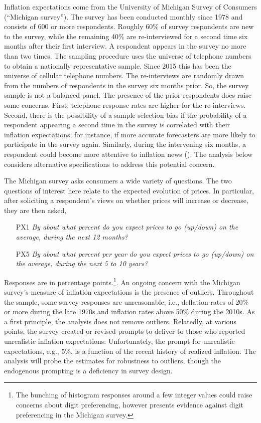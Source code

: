 \documentclass[12pt]{article}
\begin{document}
Inflation expectations come from the University of Michigan Survey of Consumers (``Michigan survey''). The survey has been conducted monthly since 1978 and consists of 600 or more respondents. Roughly 60\% of survey respondents are new to the survey, while the remaining 40\% are re-interviewed for a second time six months after their first interview. A respondent appears in the survey no more than two times. The sampling procedure uses the universe of telephone numbers to obtain a nationally representative sample. Since 2015 this has been the universe of cellular telephone numbers. The re-interviews are randomly drawn from the numbers of respondents in the survey six months prior. So, the survey sample is not a balanced panel. The presence of the prior respondents does raise some concerns. First, telephone response rates are higher for the re-interviews. Second, there is the possibility of a sample selection bias if the probability of a respondent appearing a second time in the survey is correlated with their inflation expectations; for instance, if more accurate forecasters are more likely to participate in the survey again. Similarly, during the intervening six months, a respondent could become more attentive to inflation news (\cite{BinderKim:AEJM2021}). The analysis below considers alternative specifications to address this potential concern.

The Michigan survey asks consumers a wide variety of questions. The two questions of interest here relate to the expected evolution of prices. In particular, after soliciting a respondent's views on whether prices will increase or decrease, they are then asked,
\begin{enumerate}
\item[PX1] \emph{By about what percent do you expect prices to go (up/down) on the average, during the next 12 months?}
\item[PX5] \emph{By about what percent per year do you expect prices to go (up/down) on the average, during the next 5 to 10 years?}
\end{enumerate}
Responses are in percentage points.\footnote{The bunching of histogram responses around a few integer values could raise concerns about digit preferencing, however \cite{Branch:JEDC2007} presents evidence against digit preferencing in the Michigan survey.}. An ongoing concern with the Michigan survey's measure of inflation expectations is the presence of outliers. Throughout the sample, some survey responses are unreasonable; i.e., deflation rates of 20\% or more during the late 1970s and inflation rates above 50\% during the 2010s. As a first principle, the analysis does not remove outliers. Relatedly, at various points, the survey created or revised prompts to deliver to those who reported unrealistic inflation expectations. Unfortunately, the prompt for unrealistic expectations, e.g., 5\%, is a function of the recent history of realized inflation. The analysis will probe the estimates for robustness to outliers, though the endogenous prompting is a deficiency in survey design.
\end{document}
